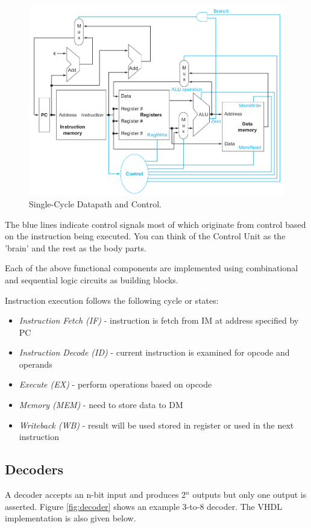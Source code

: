 \documentclass[a4paper, 11pt,oneside]{article}
\begin{document}
\begin{figure}[H]
	\includegraphics[width=\linewidth]{single-cycle-dp-control.png}
	\caption{Single-Cycle Datapath and Control.}
	\label{fig:datapath}
\end{figure}

The blue lines indicate control signals most of which originate from control based on the instruction being executed. You can think of the Control Unit as the 'brain' and the rest as the body parts.

Each of the above functional components are implemented using combinational and sequential logic circuits as building blocks. 

Instruction execution follows the following cycle or states:

\begin{itemize}
	\item {\textit{Instruction Fetch (IF)} - instruction is fetch from IM at address specified by PC}
	\item {\textit{Instruction Decode (ID)} - current instruction is examined for opcode and operands }
	\item {\textit{Execute (EX)} - perform operations based on opcode}
	\item {\textit{Memory (MEM)} - need to store data to DM}
	\item {\textit{Writeback (WB)} - result will be used stored in register or used in the next instruction}
\end{itemize}


\subsection{Decoders}
A decoder accepts an n-bit input and produces 2$^n$ outputs but only one output is asserted. Figure \ref{fig:decoder} shows an example 3-to-8 decoder. The VHDL implementation is also given below.
\end{document}
